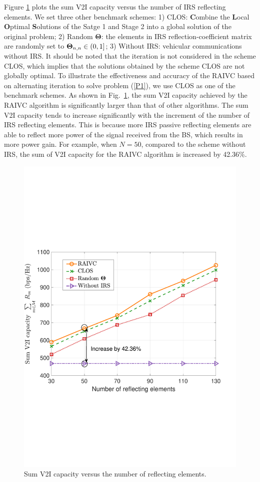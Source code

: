 \documentclass[journal]{IEEEtran}
\begin{document}
Figure \ref{Fig3} plots the sum V2I capacity versus the number of IRS reflecting elements. We set three other benchmark schemes: 1) CLOS: \textbf{C}ombine the \textbf{L}ocal \textbf{O}ptimal \textbf{S}olutions of the Satge 1 and Stage 2 into a global solution of the original problem; 2) Random $ \bm{\Theta} $: the elements in IRS reflection-coefficient matrix are randomly set to $ {{\bf{\Theta }}_{n,n}} \in \left( {0,1} \right] $; 3) Without IRS: vehicular communications without IRS. It should be noted that the iteration is not considered in the scheme CLOS, which implies that the solutions obtained by the scheme CLOS are not globally optimal. To illustrate the effectiveness and accuracy of the RAIVC based on alternating iteration to solve problem (\ref{P1}), we use CLOS as one of the benchmark schemes. As shown in Fig.~\ref{Fig3}, the sum V2I capacity achieved by the RAIVC algorithm is significantly larger than that of other algorithms. The sum V2I capacity tends to increase significantly with the increment of the number of IRS reflecting elements. This is because more IRS passive reflecting elements are able to reflect more power of the signal received from the BS, which results in more power gain. For example, when $N = 50$, compared to the scheme without IRS, the sum of V2I capacity for the RAIVC algorithm is increased by 42.36\%. 

\begin{figure}[t]
	\centering
	\includegraphics[width=0.8\linewidth]{Fig3.pdf}%
	\caption{Sum V2I capacity versus the number of reflecting elements.}\label{Fig3}
\end{figure}
\end{document}

